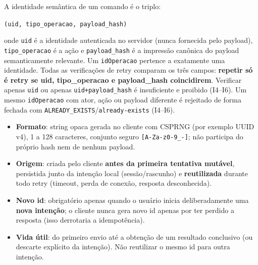 \begin{regra}
A identidade semântica de um comando é o triplo:
\begin{center}
\texttt{(uid, tipo\_operacao, payload\_hash)}
\end{center}
onde \texttt{uid} é a identidade autenticada no servidor (nunca fornecida pelo payload), \texttt{tipo\_operacao} é a ação e \texttt{payload\_hash} é a impressão canônica do payload semanticamente relevante. Um \texttt{idOperacao} pertence a exatamente uma identidade. Todas as verificações de retry comparam os três campos: \textbf{repetir só é retry se uid, tipo\_operacao e payload\_hash coincidirem}. Verificar apenas \texttt{uid} ou apenas \texttt{uid+payload\_hash} é insuficiente e proibido (I4--I6). Um mesmo \texttt{idOperacao} com ator, ação ou payload diferente é rejeitado de forma fechada com \texttt{ALREADY\_EXISTS}/\texttt{already-exists} (I4--I6).
\end{regra}

\begin{regra}
\begin{itemize}
    \item \textbf{Formato}: string opaca gerada no cliente com CSPRNG (por exemplo UUID v4), 1 a 128 caracteres, conjunto seguro \texttt{[A-Za-z0-9\_-]}; não participa do próprio hash nem de nenhum payload.
    \item \textbf{Origem}: criada pelo cliente \textbf{antes da primeira tentativa mutável}, persistida junto da intenção local (sessão/rascunho) e \textbf{reutilizada} durante todo retry (timeout, perda de conexão, resposta desconhecida).
    \item \textbf{Novo id}: obrigatório apenas quando o usuário inicia deliberadamente uma \textbf{nova intenção}; o cliente nunca gera novo id apenas por ter perdido a resposta (isso derrotaria a idempotência).
    \item \textbf{Vida útil}: do primeiro envio até a obtenção de um resultado conclusivo (ou descarte explícito da intenção). Não reutilizar o mesmo id para outra intenção.
\end{itemize}
\end{regra}

